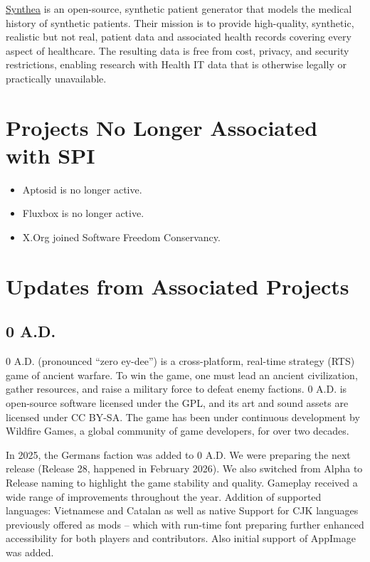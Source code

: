 \documentclass[a4paper]{report}
\begin{document}
\href{https://synthetichealth.github.io/synthea/}{Synthea} is an open-source, synthetic patient generator that models the medical history of synthetic patients. Their mission is to provide high-quality, synthetic, realistic but not real, patient data and associated health records covering every aspect of healthcare. The resulting data is free from cost, privacy, and security restrictions, enabling research with Health IT data that is otherwise legally or practically unavailable.

\section{Projects No Longer Associated with SPI}

\begin{itemize}

\item Aptosid is no longer active.

\item Fluxbox is no longer active.

\item X.Org joined Software Freedom Conservancy.

\end{itemize}

\section{Updates from Associated Projects}

\subsection{0 A.D.}

0 A.D. (pronounced ``zero ey-dee'') is a cross-platform, real-time strategy (RTS) game of ancient warfare. To win the game, one must lead an ancient civilization, gather resources, and raise a military force to defeat enemy factions. 0 A.D. is open-source software licensed under the GPL, and its art and sound assets are licensed under CC BY-SA. The game has been under continuous development by Wildfire Games, a global community of game developers, for over two decades.

In 2025, the Germans faction was added to 0 A.D. We were preparing the next release (Release 28, happened in February 2026). We also switched from Alpha to Release naming to highlight the game stability and quality. Gameplay received a wide range of improvements throughout the year. Addition of supported languages: Vietnamese and Catalan as well as native Support for CJK languages previously offered as mods -- which with run-time font preparing further enhanced accessibility for both players and contributors. Also initial support of AppImage was added.
\end{document}
